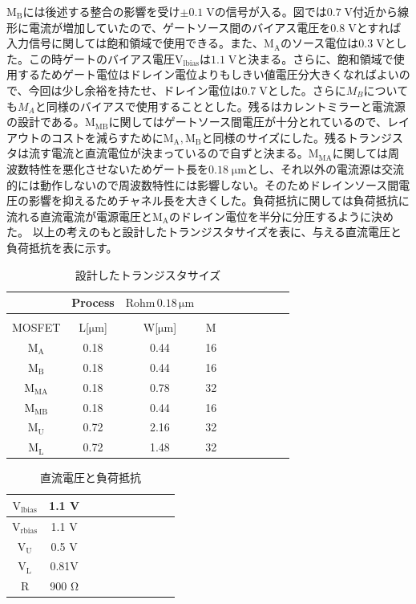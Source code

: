 \documentclass[twocolumn]{jsarticle}
\begin{document}
    $\mathrm{M_{B}}$には後述する整合の影響を受け$\pm0.1\;\mathrm{V}$の信号が入る。図では$0.7\;\mathrm{V}$付近から線形に電流が増加していたので、ゲートソース間のバイアス電圧を$0.8\;\mathrm{V}$とすれば入力信号に関しては飽和領域で使用できる。また、$\mathrm{M_{A}}$のソース電位は$0.3\;\mathrm{V}$とした。この時ゲートのバイアス電圧$\mathrm{V_{lbias}}$は$1.1\;\mathrm{V}$と決まる。さらに、飽和領域で使用するためゲート電位はドレイン電位よりもしきい値電圧分大きくなればよいので、今回は少し余裕を持たせ、ドレイン電位は$0.7\;\mathrm{V}$とした。さらに$M_{B}$についても$M_{A}$と同様のバイアスで使用することとした。残るはカレントミラーと電流源の設計である。$\mathrm{M_{MB}}$に関してはゲートソース間電圧が十分とれているので、レイアウトのコストを減らすために$\mathrm{M_{A},M_{B}}$と同様のサイズにした。残るトランジスタは流す電流と直流電位が決まっているので自ずと決まる。$\mathrm{M_{MA}}$に関しては周波数特性を悪化させないためゲート長を$0.18\;\mathrm{\mu m}$とし、それ以外の電流源は交流的には動作しないので周波数特性には影響しない。そのためドレインソース間電圧の影響を抑えるためチャネル長を大きくした。負荷抵抗に関しては負荷抵抗に流れる直流電流が電源電圧と$\mathrm{M_{A}}$のドレイン電位を半分に分圧するように決めた。
    \newpage
    以上の考えのもと設計したトランジスタサイズを表に、与える直流電圧と負荷抵抗を表に示す。
    \begin{table}[H]
    \caption{設計したトランジスタサイズ}
    \label{table:size}
    \centering
    \begin{tabular}{cccccccccc}
        \hline
        &Process&$\mathrm{Rohm\,0.18\,\mu m}$&\\
        \hline
        &&&\\
        MOSFET & L[$\mathrm{\mu m}$] & W[$\mathrm{\mu m}$] & M\\
        \hline \hline
        $\mathrm{M_{A}}$ & 0.18 & 0.44 & 16 \\
        $\mathrm{M_{B}}$ & 0.18 & 0.44 & 16 \\
        $\mathrm{M_{MA}}$& 0.18 & 0.78 & 32 \\
        $\mathrm{M_{MB}}$& 0.18 & 0.44 & 16 \\
        $\mathrm{M_{U}}$ & 0.72 & 2.16 & 32 \\
        $\mathrm{M_{L}}$ & 0.72 & 1.48 & 32 \\            
    \end{tabular}
    \end{table}
    \begin{table}[H]
    \caption{直流電圧と負荷抵抗}
    \label{table:bias}
    \centering
    \begin{tabular}{cccccccccc}
        $\mathrm{V_{lbias}}$ & 1.1 V\\\hline
        $\mathrm{V_{rbias}}$ & 1.1 V \\\hline
        $\mathrm{V_{U}}$     & 0.5 V  \\\hline
        $\mathrm{V_{L}}$     & 0.81V  \\\hline
        $\mathrm{R}$         & 900 $\mathrm{\Omega}$  
            \end{tabular}
    \end{table}
\end{document}
